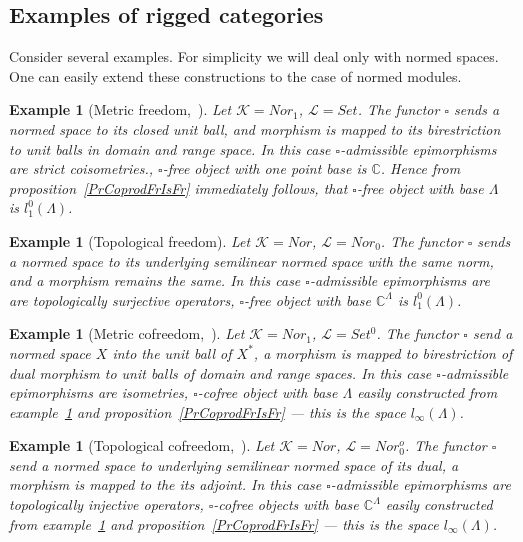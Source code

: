 \documentclass[12pt]{article}
\newtheorem{example}[theorem]{Example}
\begin{document}
\subsection{Examples of rigged categories}

Consider several examples. For simplicity we will deal only with normed spaces. 
One can easily extend these constructions to the case of normed modules.

\begin{example}[Metric freedom,~\cite{HelMetrFrQmod}]\label{ExMetrFr}
Let $\mathcal{K} = Nor_1$, $\mathcal{L} = Set$. The functor $\square$ sends a 
normed space to its closed unit ball, and morphism is mapped to its 
birestriction to unit balls in domain and range space. In this case 
$\square$-admissible epimorphisms are strict coisometries., $\square$-free 
object with one point base is $\mathbb{C}$. Hence from 
proposition~\ref{PrCoprodFrIsFr} immediately follows, 
that $\square$-free object with base $\Lambda$ is $l_1^0(\Lambda)$.
\end{example}

\begin{example}[Topological freedom]\label{ExTopFr}
Let $\mathcal{K} = Nor$, $\mathcal{L} = Nor_0$. The functor $\square$ sends 
a normed space to its underlying semilinear normed space with the same norm, 
and a morphism remains the same. In this case $\square$-admissible epimorphisms 
are are topologically surjective operators, $\square$-free object with 
base $\mathbb{C}^\Lambda$ is $l_1^0(\Lambda)$.
\end{example}

\begin{example}[Metric cofreedom,~\cite{HelMetrFrQmod}]\label{ExMetrCoFr}
Let $\mathcal{K} = Nor_1$, $\mathcal{L} = Set^0$. The functor $\square$ send 
a normed space $X$ into the unit ball of $X^*$, a morphism is mapped to 
birestriction of dual morphism to unit balls of domain and range spaces. 
In this case $\square$-admissible epimorphisms are isometries, $\square$-cofree 
object with base $\Lambda$ easily constructed from example~\ref{ExMetrFr} 
and proposition~\ref{PrCoprodFrIsFr} --- this is the space $l_\infty(\Lambda)$.
\end{example}

\begin{example}[Topological cofreedom,~\cite{ShtTopFr}]\label{ExTopCoFr}
Let $\mathcal{K} = Nor$, $\mathcal{L} = Nor_0^o$. The functor $\square$ send a 
normed space to underlying semilinear normed space of its dual, a morphism is 
mapped to the its adjoint. In this case $\square$-admissible epimorphisms are 
topologically injective operators, $\square$-cofree objects with 
base $\mathbb{C}^\Lambda$ easily constructed from example~\ref{ExTopFr} and 
proposition~\ref{PrCoprodFrIsFr} --- this is the space $l_\infty(\Lambda)$. 
\end{example}
\end{document}
